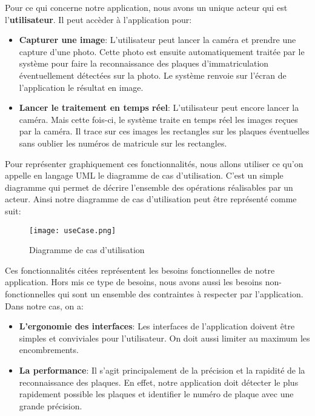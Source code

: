     Pour ce qui concerne notre application, nous avons un unique acteur qui est l’\textbf{utilisateur}. Il peut accèder à l'application pour:
    \begin{itemize}
        \item \textbf{Capturer une image}: L’utilisateur peut lancer la caméra et prendre une capture d’une photo. Cette photo est ensuite automatiquement traitée par le système pour faire la reconnaissance des plaques d’immatriculation éventuellement détectées sur la photo. Le système renvoie sur l’écran de l’application le résultat en image.
        \item \textbf{Lancer le traitement en temps réel}: L’utilisateur peut encore lancer la caméra. Mais cette fois-ci, le système traite en temps réel les images reçues par la caméra. Il trace sur ces images les rectangles sur les plaques éventuelles sans oublier les numéros de matricule sur les rectangles.
    \end{itemize}
    Pour représenter graphiquement ces fonctionnalités, nous allons utiliser ce qu’on appelle en langage UML le diagramme de cas d’utilisation. C’est un simple diagramme qui permet de décrire l’ensemble des opérations réalisables par un acteur. Ainsi notre diagramme de cas d’utilisation peut être représenté comme suit:
    \begin{figure}[H]
        \centering
        \texttt{[image: useCase.png]}
        \caption{Diagramme de cas d'utilisation}
    \end{figure}
    Ces fonctionnalités citées représentent les besoins fonctionnelles de notre application. Hors mis ce type de besoins, nous avons aussi les besoins non-fonctionnelles qui sont un ensemble des contraintes à respecter par l'application. Dans notre cas, on a:
    \begin{itemize}
        \item \textbf{L'ergonomie des interfaces}: Les interfaces de l'application doivent être simples et conviviales pour l'utilisateur. On doit aussi limiter au maximum les encombrements.
        \item \textbf{La performance}: Il s'agit principalement de la précision et la rapidité de la reconnaissance des plaques. En effet, notre application doit détecter le plus rapidement possible les plaques et identifier le numéro de plaque avec une grande précision. 
    \end{itemize}

